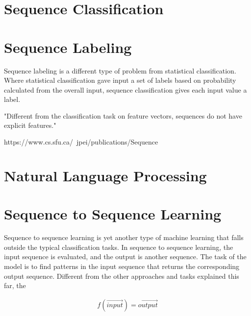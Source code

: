
\section{Sequence Classification}


\section{Sequence Labeling}
Sequence labeling is a different type of problem from statistical classification. Where statistical classification gave input a set of labels based on probability calculated from the overall input, sequence classification gives each input value a label.

"Different from
the classification task on feature vectors, sequences do not
have explicit features."

https://www.cs.sfu.ca/~jpei/publications/Sequence%


\section{Natural Language Processing}


\section{Sequence to Sequence Learning}
Sequence to sequence learning is yet another type of machine learning that falls outside the typical classification tasks. In sequence to sequence learning, the input sequence is evaluated, and the output is another sequence. The task of the model is to find patterns in the input sequence that returns the corresponding output sequence. Different from the other approaches and tasks explained this far, the 

\begin{equation}
    \begin{aligned}
        f(\vec{input}) = \vec{output}
    \end{aligned}
\end{equation}
